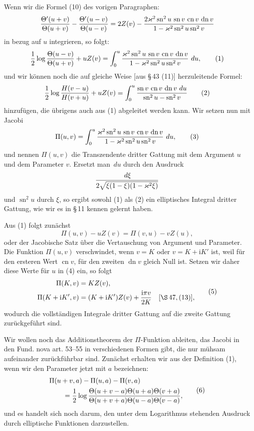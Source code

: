 \documentclass[11pt]{article}
\providecommand{\dd}{\,d}
\providecommand{\sn}{\operatorname{sn}}
\providecommand{\cn}{\operatorname{cn}}
\providecommand{\dn}{\operatorname{dn}}
\providecommand{\ii}{\mathrm{i}}
\begin{document}
Wenn wir die Formel (10) des vorigen Paragraphen:
\[
{\Theta'(u+v)\over\Theta(u+v)}-{\Theta'(u-v)\over\Theta(u-v)}
=2Z(v)-{2\varkappa^2\sn^2u\,\sn v\,\cn v\,\dn v\over1-\varkappa^2\sn^2u\sn^2v}
\]
in bezug auf $u$ integrieren, so folgt:
\begin{equation}
{1\over2}\log{\Theta(u-v)\over\Theta(u+v)}+uZ(v)
=\int_0^u {\varkappa^2\sn^2u\,\sn v\,\cn v\,\dn v\over1-\varkappa^2\sn^2u\sn^2v}\,\dd u,
\tag{1}
\end{equation}
und wir können noch die auf gleiche Weise [aus \S\,43 (11)] herzuleitende Formel:
\begin{equation}
{1\over2}\log{H(v-u)\over H(v+u)}+uZ(v)
=\int_0^u {\sn v\,\cn v\,\dn v\,\dd u\over\sn^2u-\sn^2v}
\tag{2}
\end{equation}
hinzufügen, die übrigens auch aus (1) abgeleitet werden kann. Wir setzen nun mit Jacobi
\begin{equation}
\Pi(u,v)=\int_0^u {\varkappa^2\sn^2u\,\sn v\,\cn v\,\dn v\over1-\varkappa^2\sn^2u\sn^2v}\,\dd u,
\tag{3}
\end{equation}
und nennen $\Pi(u,v)$ die Transzendente dritter Gattung mit dem Argument $u$ und dem Parameter $v$. Ersetzt man $\dd u$ durch den Ausdruck
\[
{\dd\xi\over2\sqrt{\xi(1-\xi)(1-\varkappa^2\xi)}}
\]
und $\sn^2u$ durch $\xi$, so ergibt sowohl (1) als (2) ein elliptisches Integral dritter Gattung, wie wir es in \S\,11 kennen gelernt haben.

Aus (1) folgt zunächst
\begin{equation}
\Pi(u,v)-uZ(v)=\Pi(v,u)-vZ(u),
\tag{4}
\end{equation}
oder der Jacobische Satz über die Vertauschung von Argument und Parameter. Die Funktion $\Pi(u,v)$ verschwindet, wenn $v=K$ oder $v=K+\ii K'$ ist, weil für den ersteren Wert $\cn v$, für den zweiten $\dn v$ gleich Null ist. Setzen wir daher diese Werte für $u$ in (4) ein, so folgt
\begin{equation}
\begin{aligned}
\Pi(K,v)&=KZ(v),\\
\Pi(K+\ii K',v)&=(K+\ii K')Z(v)+{\ii\pi v\over2K}\quad[\S\,47,(13)],
\end{aligned}
\tag{5}
\end{equation}
wodurch die vollständigen Integrale dritter Gattung auf die zweite Gattung zurückgeführt sind.

Wir wollen noch das Additionstheorem der $\Pi$-Funktion ableiten, das Jacobi in den Fund. nova art. 53--55 in verschiedenen Formen gibt, die nur mühsam aufeinander zurückführbar sind. Zunächst erhalten wir aus der Definition (1), wenn wir den Parameter jetzt mit $a$ bezeichnen:
\begin{equation}
\begin{aligned}
&\Pi(u+v,a)-\Pi(u,a)-\Pi(v,a)\\
&\qquad={1\over2}\log{\Theta(u+v-a)\Theta(u+a)\Theta(v+a)
\over\Theta(u+v+a)\Theta(u-a)\Theta(v-a)},
\end{aligned}
\tag{6}
\end{equation}
und es handelt sich noch darum, den unter dem Logarithmus stehenden Ausdruck durch elliptische Funktionen darzustellen.
\end{document}
